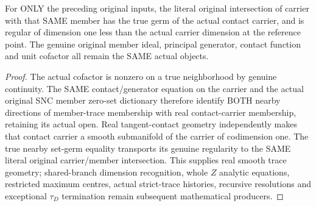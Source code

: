 \begin{theorem}
\label{hir:sharp-original-order-one-member-actual-smooth-relative-hypersurface}
\leanok
For ONLY the preceding original inputs, the literal original intersection of
carrier with that SAME member has the true germ of the actual contact carrier,
and is regular of dimension one less than the actual carrier dimension at the
reference point. The genuine original member ideal, principal generator,
contact function and unit cofactor all remain the SAME actual objects.
\end{theorem}
\begin{proof}
The actual cofactor is nonzero on a true neighborhood by genuine continuity.
The SAME contact/generator equation on the carrier and the actual original
SNC member zero-set dictionary therefore identify BOTH nearby directions of
member-trace membership with real contact-carrier membership, retaining its
actual open. Real tangent-contact geometry independently makes that contact
carrier a smooth submanifold of the carrier of codimension one. The true
nearby set-germ equality transports its genuine regularity to the SAME literal
original carrier/member intersection. This supplies real smooth trace geometry;
shared-branch dimension recognition, whole $Z$ analytic equations, restricted
maximum centres, actual strict-trace histories, recursive resolutions and
exceptional $\tau_D$ termination remain subsequent mathematical producers.
\end{proof}
